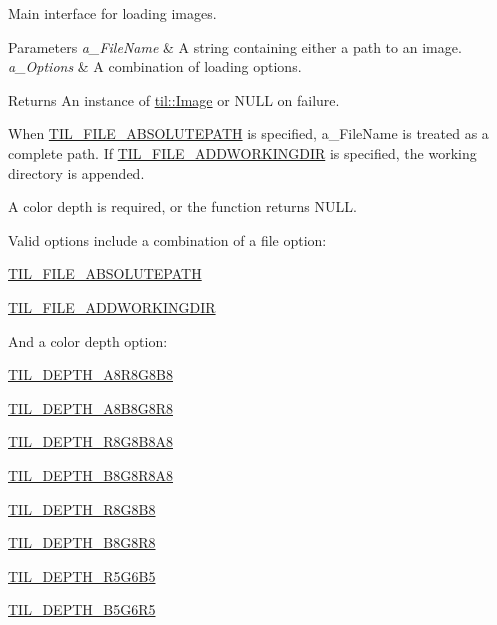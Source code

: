 Main interface for loading images. 


\begin{DoxyParams}{Parameters}
{\em a\_\-FileName} & A string containing either a path to an image. \\
\hline
{\em a\_\-Options} & A combination of loading options.\\
\hline
\end{DoxyParams}
\begin{DoxyReturn}{Returns}
An instance of \hyperlink{classtil_1_1_image}{til::Image} or NULL on failure.
\end{DoxyReturn}
When \hyperlink{_t_i_l_settings_8h_a35df91f5e83de2ea6177f37406e487d9}{TIL\_\-FILE\_\-ABSOLUTEPATH} is specified, a\_\-FileName is treated as a complete path. If \hyperlink{_t_i_l_settings_8h_a46033ff709c68056a163fefecfae188a}{TIL\_\-FILE\_\-ADDWORKINGDIR} is specified, the working directory is appended.

A color depth is required, or the function returns NULL.

Valid options include a combination of a file option:
\begin{DoxyItemize}
\item \hyperlink{_t_i_l_settings_8h_a35df91f5e83de2ea6177f37406e487d9}{TIL\_\-FILE\_\-ABSOLUTEPATH}
\item \hyperlink{_t_i_l_settings_8h_a46033ff709c68056a163fefecfae188a}{TIL\_\-FILE\_\-ADDWORKINGDIR}
\end{DoxyItemize}

And a color depth option:
\begin{DoxyItemize}
\item \hyperlink{_t_i_l_settings_8h_a58c600319f21b801f568a6a3d9bb8498}{TIL\_\-DEPTH\_\-A8R8G8B8}
\item \hyperlink{_t_i_l_settings_8h_aa41c714a49a57e84fe823a09e898c074}{TIL\_\-DEPTH\_\-A8B8G8R8}
\item \hyperlink{_t_i_l_settings_8h_a7680a63e7db6fd73c8f86dc664230603}{TIL\_\-DEPTH\_\-R8G8B8A8}
\item \hyperlink{_t_i_l_settings_8h_a309fc72c68361d00c16ca31594e46347}{TIL\_\-DEPTH\_\-B8G8R8A8}
\item \hyperlink{_t_i_l_settings_8h_ad3ddbb7aac9818550ea9f8d4f7785e4c}{TIL\_\-DEPTH\_\-R8G8B8}
\item \hyperlink{_t_i_l_settings_8h_abec87556ef2dbb71ca9a5f45c573cd3c}{TIL\_\-DEPTH\_\-B8G8R8}
\item \hyperlink{_t_i_l_settings_8h_a77a6c97d164dff0f9ad8abf92af7e344}{TIL\_\-DEPTH\_\-R5G6B5}
\item \hyperlink{_t_i_l_settings_8h_a1e6113bd728b3fe56f7cf3ead15fb4f0}{TIL\_\-DEPTH\_\-B5G6R5}
\end{DoxyItemize}

